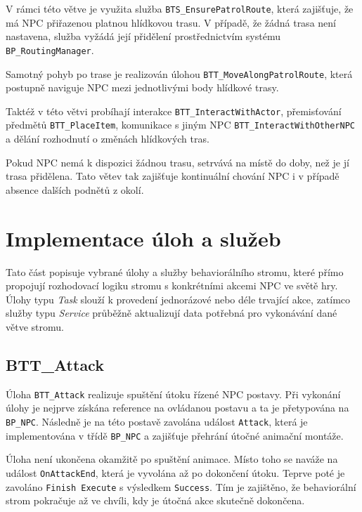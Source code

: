 V rámci této větve je využita služba \texttt{BTS\_EnsurePatrolRoute}, která zajišťuje, že má NPC přiřazenou platnou hlídkovou trasu.
V případě, že žádná trasa není nastavena, služba vyžádá její přidělení prostřednictvím systému \texttt{BP\_RoutingManager}.

Samotný pohyb po trase je realizován úlohou \texttt{BTT\_MoveAlongPatrolRoute}, která postupně naviguje NPC mezi jednotlivými body hlídkové trasy.

Taktéž v této větvi probíhají interakce \texttt{BTT\_InteractWithActor}, přemisťování předmětů \texttt{BTT\_PlaceItem}, komunikace 
s jiným NPC \texttt{BTT\_InteractWithOtherNPC} a dělání rozhodnutí o změnách hlídkových tras. 

Pokud NPC nemá k dispozici žádnou trasu, setrvává na místě do doby, než je jí trasa přidělena.
Tato větev tak zajišťuje kontinuální chování NPC i v případě absence dalších podnětů z okolí.

\section{Implementace úloh a služeb}
\label{sec:implementace-tasky}

Tato část popisuje vybrané úlohy a služby behaviorálního stromu, které přímo propojují rozhodovací logiku stromu s konkrétními akcemi NPC ve světě hry. 
Úlohy typu \textit{Task} slouží k provedení jednorázové nebo déle trvající akce, zatímco služby typu \textit{Service} průběžně aktualizují data potřebná pro vykonávání dané větve stromu.

\subsection{BTT\_Attack}

Úloha \texttt{BTT\_Attack} realizuje spuštění útoku řízené NPC postavy. 
Při vykonání úlohy je nejprve získána reference na ovládanou postavu a ta je přetypována na \texttt{BP\_NPC}. 
Následně je na této postavě zavolána událost \texttt{Attack}, která je implementována v třídě \texttt{BP\_NPC} a zajišťuje přehrání útočné animační montáže.

Úloha není ukončena okamžitě po spuštění animace. 
Místo toho se naváže na událost \texttt{OnAttackEnd}, která je vyvolána až po dokončení útoku. 
Teprve poté je zavoláno \texttt{Finish Execute} s výsledkem \texttt{Success}. 
Tím je zajištěno, že behaviorální strom pokračuje až ve chvíli, kdy je útočná akce skutečně dokončena.

